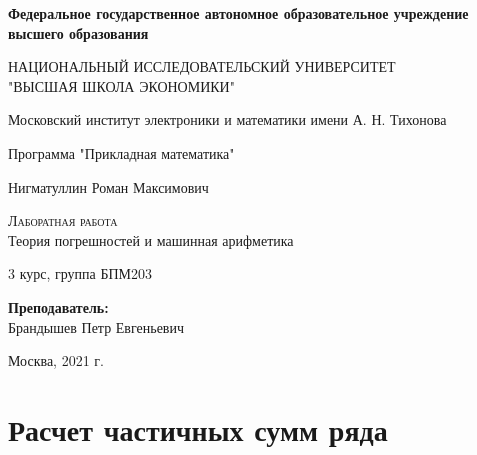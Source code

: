 \documentclass{article}
\newenvironment{pseudolisting}
 {\begin{minipage}{\linewidth}\vspace*{\topsep}}
 {\vspace*{\topsep}\end{minipage}}
\begin{document}
\begin{titlepage}
  \begin{center}
    \large
     
    \textbf{Федеральное государственное автономное образовательное учреждение высшего образования}
    \vspace{0.5cm}
 
    НАЦИОНАЛЬНЫЙ ИССЛЕДОВАТЕЛЬСКИЙ УНИВЕРСИТЕТ \\ "ВЫСШАЯ ШКОЛА ЭКОНОМИКИ"
    \vspace{0.5cm}
     
    Московский институт электроники и математики имени А. Н. Тихонова 
     
    Программа "Прикладная математика"
    \vfill
     
     
    Нигматуллин Роман Максимович
    \vfill
 
    \textsc{Лаборатная работа}\\[5mm]
     
    {\LARGE Теория погрешностей и машинная арифметика\\[2mm]
    }
  \bigskip
     
    3 курс, группа БПМ203
\end{center}
\vfill
 

 
\hfill\begin{flushright}
  \textbf{Преподаватель:}\\
  Брандышев Петр Евгеньевич
\end{flushright}%
\vfill
 
\begin{center}
  Москва, 2021 г.
\end{center}
\end{titlepage}

\section{Расчет частичных сумм ряда}

\begin{pseudolisting}
\inputminted{python}{series.py}
\end{pseudolisting}
\end{document}
